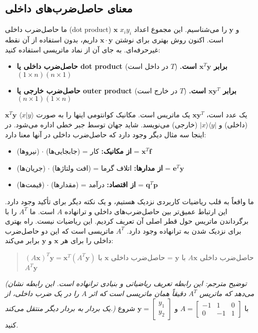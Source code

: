 \documentclass[12pt, a4paper]{book}
\begin{document}
	\subsection*{معنای حاصل‌ضرب‌های داخلی}
	ما حاصل‌ضرب داخلی (dot product) $\mathbf{x}$ و $\mathbf{y}$ را می‌شناسیم. این مجموع اعداد $x_iy_i$ است. اکنون روش بهتری برای نوشتن $\mathbf{x} \cdot \mathbf{y}$ داریم، بدون استفاده از آن نقطه غیرحرفه‌ای. به جای آن از نماد ماتریسی استفاده کنید:
	\begin{itemize}
		\item \textbf{حاصل‌ضرب داخلی یا dot product برابر $\mathbf{x}^T\mathbf{y}$ است.} ($T$ در داخل است) \quad $(1 \times n)(n \times 1)$
		\item \textbf{حاصل‌ضرب خارجی یا outer product برابر $\mathbf{xy}^T$ است.} ($T$ در خارج است) \quad $(n \times 1)(1 \times n)$
	\end{itemize}
	$\mathbf{x}^T\mathbf{y}$ یک عدد است، $\mathbf{xy}^T$ یک ماتریس است. مکانیک کوانتومی اینها را به صورت $\langle x|y \rangle$ (داخلی) و $|x \rangle \langle y|$ (خارجی) می‌نویسد. شاید جهان توسط جبر خطی اداره می‌شود. در اینجا سه مثال دیگر وجود دارد که حاصل‌ضرب داخلی در آنها معنا دارد:
	\begin{itemize}
		\item \textbf{از مکانیک:} کار = (جابجایی‌ها) $\cdot$ (نیروها) = $\mathbf{x}^T\mathbf{f}$
		\item \textbf{از مدارها:} اتلاف گرما = (افت ولتاژها) $\cdot$ (جریان‌ها) = $\mathbf{e}^T\mathbf{y}$
		\item \textbf{از اقتصاد:} درآمد = (مقدارها) $\cdot$ (قیمت‌ها) = $\mathbf{q}^T\mathbf{p}$
	\end{itemize}
	ما واقعاً به قلب ریاضیات کاربردی نزدیک هستیم، و یک نکته دیگر برای تأکید وجود دارد. این ارتباط عمیق‌تر بین حاصل‌ضرب‌های داخلی و ترانهاده $A$ است.
	ما $A^T$ را با برگرداندن ماتریس حول قطر اصلی آن تعریف کردیم. این ریاضیات نیست. راه بهتری برای نزدیک شدن به ترانهاده وجود دارد. $A^T$ ماتریسی است که این دو حاصل‌ضرب داخلی را برای هر $\mathbf{x}$ و $\mathbf{y}$ برابر می‌کند:
	\begin{quote}
		$(A\mathbf{x})^T\mathbf{y} = \mathbf{x}^T(A^T\mathbf{y})$ \quad حاصل‌ضرب داخلی $A\mathbf{x}$ با $\mathbf{y}$ = حاصل‌ضرب داخلی $\mathbf{x}$ با $A^T\mathbf{y}$
	\end{quote}
	\textit{(توضیح مترجم: این رابطه تعریف ریاضیاتی و بنیادی ترانهاده است. این رابطه نشان می‌دهد که ماتریس $A^T$ دقیقاً همان ماتریسی است که اثر $A$ را در یک ضرب داخلی، از یک بردار به بردار دیگر منتقل می‌کند.)}
	با $A=\begin{bmatrix} -1 & 1 & 0 \\ 0 & -1 & 1 \end{bmatrix}$ و $\mathbf{y}=\begin{bmatrix} y_1 \\ y_2 \end{bmatrix}$ شروع کنید.
\end{document}
